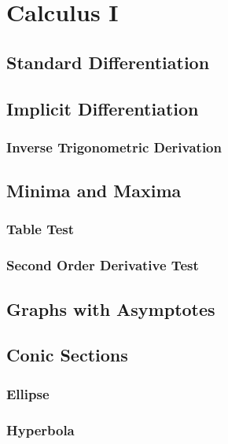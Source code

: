 \documentclass[../main]{subfiles}
\begin{document}
\section{Calculus I}

\subsection{Standard Differentiation}

\subsection{Implicit Differentiation}

\subsubsection{Inverse Trigonometric Derivation}

\subsection{Minima and Maxima}

\subsubsection{Table Test}

\subsubsection{Second Order Derivative Test}

\subsection{Graphs with Asymptotes}

\subsection{Conic Sections}

\subsubsection{Ellipse}

\subsubsection{Hyperbola}
\end{document}
